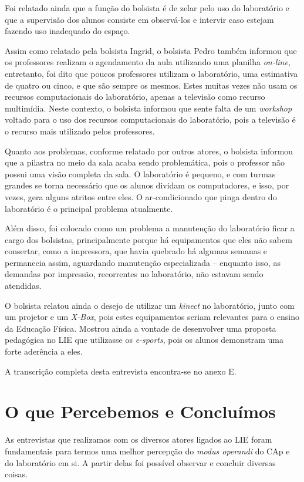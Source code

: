 Foi relatado ainda que a função do bolsista é de zelar pelo uso do laboratório e que a supervisão dos alunos consiste em observá-los e intervir caso estejam fazendo uso inadequado do espaço.

Assim como relatado pela bolsista Ingrid, o bolsista Pedro também informou que os professores realizam o agendamento da aula utilizando uma planilha \textit{on-line}, entretanto, foi dito que poucos professores utilizam o laboratório, uma estimativa de quatro ou cinco, e que são sempre os mesmos. Estes muitas vezes não usam os recursos computacionais do laboratório, apenas a televisão como recurso multimídia. Neste contexto, o bolsista informou que sente falta de um \textit{workshop} voltado para o uso dos recursos computacionais do laboratório, pois a televisão é o recurso mais utilizado pelos professores.

Quanto aos problemas, conforme relatado por outros atores, o bolsista informou que a pilastra no meio da sala acaba sendo problemática, pois o professor não possui uma visão completa da sala. O laboratório é pequeno, e com turmas grandes se torna necessário que os alunos dividam os computadores, e isso, por vezes, gera alguns atritos entre eles. O ar-condicionado que pinga dentro do laboratório é o principal problema atualmente.

Além disso, foi colocado como um problema a manutenção do laboratório ficar a cargo dos bolsistas, principalmente porque há equipamentos que eles não sabem consertar, como a impressora, que havia quebrado há algumas semanas e permanecia assim, aguardando manutenção especializada -- enquanto isso, as demandas por impressão, recorrentes no laboratório, não estavam sendo atendidas.

O bolsista relatou ainda o desejo de utilizar um \textit{kinect} no laboratório, junto com um projetor e um \textit{X-Box}, pois estes equipamentos seriam relevantes para o ensino da Educação Física. Mostrou ainda a vontade de desenvolver uma proposta pedagógica no LIE que utilizasse os \textit{e-sports}, pois os alunos demonstram uma forte aderência a eles.

A transcrição completa desta entrevista encontra-se no anexo E.

\section{O que Percebemos e Concluímos}\label{chp:LABEL_CHP_ENT_OBS_CONC}

As entrevistas que realizamos com os diversos atores ligados ao LIE foram fundamentais para termos uma melhor percepção do \textit{modus operandi} do CAp e do laboratório em si. A partir delas foi possível observar e concluir diversas coisas.

